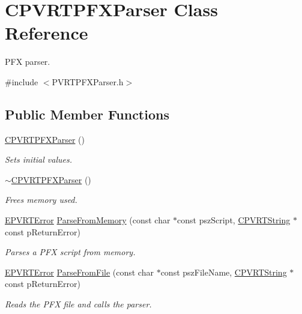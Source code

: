 \hypertarget{class_c_p_v_r_t_p_f_x_parser}{\section{C\+P\+V\+R\+T\+P\+F\+X\+Parser Class Reference}
\label{class_c_p_v_r_t_p_f_x_parser}
}


P\+F\+X parser.  




{\ttfamily \#include $<$P\+V\+R\+T\+P\+F\+X\+Parser.\+h$>$}

\subsection*{Public Member Functions}
\begin{DoxyCompactItemize}
\item 
\hyperlink{class_c_p_v_r_t_p_f_x_parser_ab7b0e0decc8cb6f24b1ae2e11cf7fe07}{C\+P\+V\+R\+T\+P\+F\+X\+Parser} ()
\begin{DoxyCompactList}\small\item\em Sets initial values. \end{DoxyCompactList}\item 
\hyperlink{class_c_p_v_r_t_p_f_x_parser_a4928420b8ff017668c80325e13b6b081}{$\sim$\+C\+P\+V\+R\+T\+P\+F\+X\+Parser} ()
\begin{DoxyCompactList}\small\item\em Frees memory used. \end{DoxyCompactList}\item 
\hyperlink{_p_v_r_t_error_8h_a9e837ff1a83f3a5f332bc4cc78454608}{E\+P\+V\+R\+T\+Error} \hyperlink{class_c_p_v_r_t_p_f_x_parser_a99116781faf9aa20d7696ff768a8c640}{Parse\+From\+Memory} (const char $\ast$const psz\+Script, \hyperlink{class_c_p_v_r_t_string}{C\+P\+V\+R\+T\+String} $\ast$const p\+Return\+Error)
\begin{DoxyCompactList}\small\item\em Parses a P\+F\+X script from memory. \end{DoxyCompactList}\item 
\hyperlink{_p_v_r_t_error_8h_a9e837ff1a83f3a5f332bc4cc78454608}{E\+P\+V\+R\+T\+Error} \hyperlink{class_c_p_v_r_t_p_f_x_parser_ae1a2dba178d9960729d6c5a04255370f}{Parse\+From\+File} (const char $\ast$const psz\+File\+Name, \hyperlink{class_c_p_v_r_t_string}{C\+P\+V\+R\+T\+String} $\ast$const p\+Return\+Error)
\begin{DoxyCompactList}\small\item\em Reads the P\+F\+X file and calls the parser. \end{DoxyCompactList}\item 

\end{DoxyCompactItemize}
